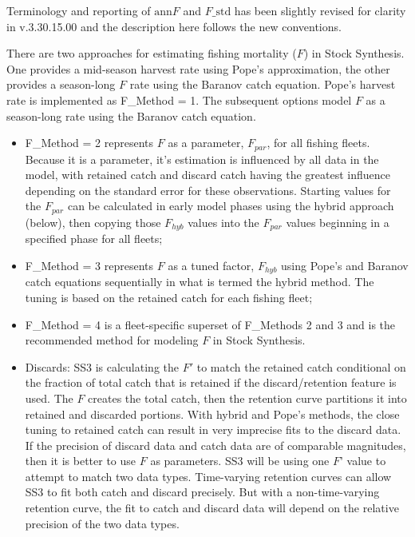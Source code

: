 Terminology and reporting of $\text{ann}F$ and $F\text{\_std}$ has been slightly revised for clarity in v.3.30.15.00 and the description here follows the new conventions.

There are two approaches for estimating fishing mortality ($F$) in Stock Synthesis. One provides a mid-season harvest rate using Pope’s approximation, the other provides a season-long $F$ rate using the Baranov catch equation. Pope’s harvest rate is implemented as F\_Method = 1. The subsequent options model $F$ as a season-long rate using the Baranov catch equation.

\begin{itemize}
	\item F\_Method = 2 represents $F$ as a parameter, $F_{par}$, for all fishing fleets. Because it is a parameter, it's estimation is influenced by all data in the model, with retained catch and discard catch having the greatest influence depending on the standard error for these observations. Starting values for the $F_{par}$ can be calculated in early model phases using the hybrid approach (below), then copying those $F_{hyb}$ values into the $F_{par}$ values beginning in a specified phase for all fleets;
	\item F\_Method = 3 represents $F$ as a tuned factor, $F_{hyb}$ using Pope's and Baranov catch equations sequentially in what is termed the hybrid method. The tuning is based on the retained catch for each fishing fleet;
	\item F\_Method = 4 is a fleet-specific superset of F\_Methods 2 and 3 and is the recommended method for modeling $F$ in Stock Synthesis.
	\item Discards: SS3 is calculating the $F'$ to match the retained catch conditional on the fraction of total catch that is retained if the discard/retention feature is used. The $F$ creates the total catch, then the retention curve partitions it into retained and discarded portions. With hybrid and Pope’s methods, the close tuning to retained catch can result in very imprecise fits to the discard data. If the precision of discard data and catch data are of comparable magnitudes, then it is better to use $F$ as parameters. SS3 will be using one $F’$ value to attempt to match two data types. Time-varying retention curves can allow SS3 to fit both catch and discard precisely. But with a non-time-varying retention curve, the fit to catch and discard data will depend on the relative precision of the two data types.
\end{itemize}

